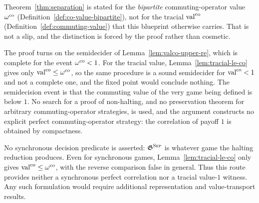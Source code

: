 \begin{remark}
\label{rem:separation-which-value}
Theorem~\ref{thm:separation} is stated for the \emph{bipartite} commuting-operator value
$\omega^{\mathrm{co}}$ (Definition~\ref{def:co-value-bipartite}), not for the tracial $\mathrm{val}^{\mathrm{co}}$
(Definition~\ref{def:commuting-value}) that this blueprint otherwise carries. That is not a
slip, and the distinction is forced by the proof rather than cosmetic.

The proof turns on the semidecider of Lemma~\ref{lem:valco-upper-re}, which is complete for
the event $\omega^{\mathrm{co}} < 1$. For the tracial value, Lemma~\ref{lem:tracial-le-co} gives only
$\mathrm{val}^{\mathrm{co}} \leq \omega^{\mathrm{co}}$, so the same procedure is a sound semidecider for $\mathrm{val}^{\mathrm{co}} < 1$ and not
a complete one, and the fixed point would conclude nothing. The semidecision event is that
the commuting value of the very game being defined is below $1$. No search for a proof of
non-halting, and no preservation theorem for arbitrary commuting-operator strategies, is
used, and the argument constructs no explicit perfect commuting-operator strategy: the
correlation of payoff $1$ is obtained by compactness.

No synchronous decision predicate is asserted: $\mathfrak{G}^{\textsc{Sep}}$ is whatever game the halting
reduction produces. Even for synchronous games, Lemma~\ref{lem:tracial-le-co} only gives
$\mathrm{val}^{\mathrm{co}}\leq\omega^{\mathrm{co}}$, with the reverse comparison false in general. Thus this route provides
neither a synchronous perfect correlation nor a tracial value-$1$ witness. Any such
formulation would require additional representation and value-transport results.
\end{remark}

